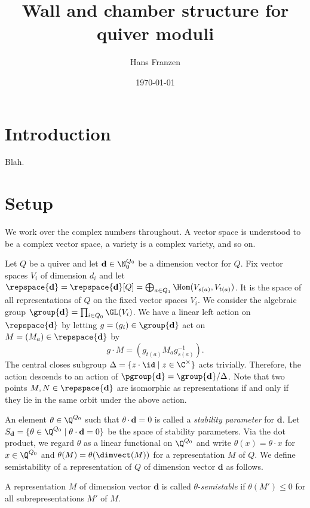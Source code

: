 \documentclass[11pt, a4paper]{amsart}
\title{Wall and chamber structure for quiver moduli}
\author{Hans Franzen}
\date{\today}
\begin{document}
	\maketitle
	
	\section{Introduction}

	Blah.
	
	\section{Setup}
	
	We work over the complex numbers throughout. A vector space is understood to be a complex vector space, a variety is a complex variety, and so on.
	
	Let $Q$ be a quiver and let $\mathbf{d} \in \smash{\N_0^{Q_0}}$ be a dimension vector for $Q$. Fix vector spaces $V_i$ of dimension $d_i$ and let $\repspace{\mathbf{d}} = \repspace{\mathbf{d}}[Q] = \bigoplus_{a \in Q_1} \Hom(V_{s(a)},V_{t(a)})$. It is the space of all representations of $Q$ on the fixed vector spaces $V_i$. We consider the algebraic group $\group{\mathbf{d}} = \prod_{i \in Q_0} \GL(V_i)$. We have a linear left action on $\repspace{\mathbf{d}}$ by letting $g = (g_i) \in \group{\mathbf{d}}$ act on $M = (M_a) \in \repspace{\mathbf{d}}$ by
	\[
		g\cdot M = (g_{t(a)}M_ag_{s(a)}^{-1}).
	\]
	The central closes subgroup $\Delta = \{z\cdot\id \mid z \in \C^\times\}$ acts trivially. Therefore, the action descends to an action of $\pgroup{\mathbf{d}} = \group{\mathbf{d}}/\Delta$. Note that two points $M, N \in \repspace{\mathbf{d}}$ are isomorphic as representations if and only if they lie in the same orbit under the above action.
	
	An element $\theta \in \Q^{Q_0}$ such that $\theta\cdot \mathbf{d} = 0$ is called a \emph{stability parameter} for $\mathbf{d}$. Let $S_\mathbf{d} = \{\theta \in \Q^{Q_0} \mid \theta\cdot \mathbf{d} = 0\}$ be the space of stability parameters. Via the dot product, we regard $\theta$ as a linear functional on $\Q^{Q_0}$ and write $\theta(x) = \theta\cdot x$ for $x \in \Q^{Q_0}$ and $\theta(M) = \theta(\dimvect(M))$ for a representation $M$ of $Q$. We define semistability of a representation of $Q$ of dimension vector $\mathbf{d}$ as follows.
	
	\begin{defn*}
		A representation $M$ of dimension vector $\mathbf{d}$ is called $\theta$-\emph{semistable} if $\theta(M') \leq 0$ for all subrepresentations $M'$ of $M$.
	\end{defn*}
\end{document}

